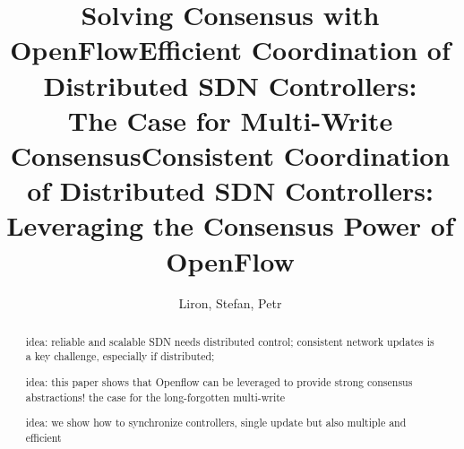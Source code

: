 \documentclass[conference]{sigcomm-alternate}
\def\SAVESPACE{1}
\begin{document}
\sloppy




\title{Solving Consensus with OpenFlow}

\title{Efficient Coordination of Distributed SDN Controllers:\\The Case for Multi-Write Consensus}

\title{Consistent Coordination of Distributed SDN Controllers:\\Leveraging the Consensus Power of OpenFlow}


\author{Liron, Stefan, Petr}


\date{}


\maketitle


\thispagestyle{empty}





\begin{abstract}
idea: reliable and scalable SDN needs distributed control; consistent network updates
is a key challenge, especially if distributed;

idea: this paper shows that Openflow can be leveraged to provide strong consensus
abstractions! the case for the long-forgotten multi-write

idea: we show how to synchronize controllers, single update but also multiple and efficient
\end{abstract}
\end{document}
